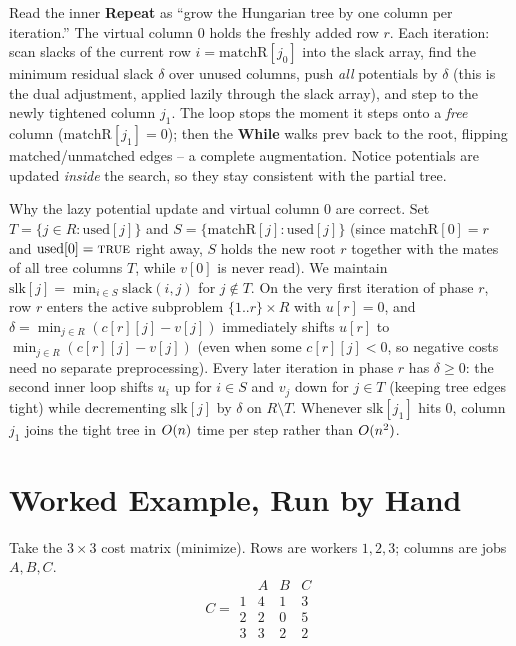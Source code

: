\begin{intuitionbox}
Read the inner \textbf{Repeat} as ``grow the Hungarian tree by one column per iteration.'' The virtual column $0$ holds the freshly added row $r$. Each iteration: scan slacks of the current row $i=\mathrm{matchR}[j_0]$ into the slack array, find the minimum residual slack $\delta$ over unused columns, push \emph{all} potentials by $\delta$ (this is the dual adjustment, applied lazily through the slack array), and step to the newly tightened column $j_1$. The loop stops the moment it steps onto a \emph{free} column ($\mathrm{matchR}[j_1]=0$); then the \textbf{While} walks $\mathrm{prev}$ back to the root, flipping matched/unmatched edges -- a complete augmentation. Notice potentials are updated \emph{inside} the search, so they stay consistent with the partial tree.
\end{intuitionbox}

\begin{whybox}
Why the lazy potential update and virtual column $0$ are correct. Set $T=\{j\in R : \mathrm{used}[j]\}$ and $S=\{\mathrm{matchR}[j] : \mathrm{used}[j]\}$ (since $\mathrm{matchR}[0]=r$ and $\mathrm{used}[0]=\textsc{true}$ right away, $S$ holds the new root $r$ together with the mates of all tree columns $T$, while $v[0]$ is never read). We maintain $\mathrm{slk}[j]=\min_{i\in S}\mathrm{slack}(i,j)$ for $j\notin T$. On the very first iteration of phase $r$, row $r$ enters the active subproblem $\{1..r\}\times R$ with $u[r]=0$, and $\delta=\min_{j\in R}(c[r][j]-v[j])$ immediately shifts $u[r]$ to $\min_{j\in R}(c[r][j]-v[j])$ (even when some $c[r][j]<0$, so negative costs need no separate preprocessing). Every later iteration in phase $r$ has $\delta\ge 0$: the second inner loop shifts $u_i$ up for $i\in S$ and $v_j$ down for $j\in T$ (keeping tree edges tight) while decrementing $\mathrm{slk}[j]$ by $\delta$ on $R\setminus T$. Whenever $\mathrm{slk}[j_1]$ hits $0$, column $j_1$ joins the tight tree in $O(n)$ time per step rather than $O(n^2)$.
\end{whybox}

\section{Worked Example, Run by Hand}
\label{ch16:worked}

Take the $3\times3$ cost matrix (minimize). Rows are workers $1,2,3$; columns are jobs $A,B,C$.
\[
  C=\begin{array}{c|ccc}
      & A & B & C\\\hline
    1 & 4 & 1 & 3\\
    2 & 2 & 0 & 5\\
    3 & 3 & 2 & 2
  \end{array}
\]

